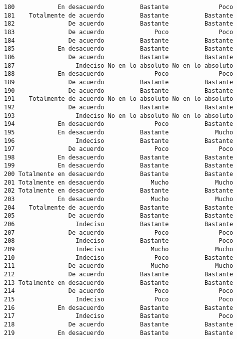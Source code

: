 \documentclass[
  letterpaper,
  DIV=11,
  numbers=noendperiod]{scrartcl}
\begin{document}
\begin{verbatim}
180            En desacuerdo          Bastante              Poco
181    Totalmente de acuerdo          Bastante          Bastante
182               De acuerdo          Bastante          Bastante
183               De acuerdo              Poco              Poco
184               De acuerdo          Bastante          Bastante
185            En desacuerdo          Bastante          Bastante
186               De acuerdo          Bastante          Bastante
187                 Indeciso No en lo absoluto No en lo absoluto
188            En desacuerdo              Poco              Poco
189               De acuerdo          Bastante          Bastante
190               De acuerdo          Bastante          Bastante
191    Totalmente de acuerdo No en lo absoluto No en lo absoluto
192               De acuerdo          Bastante          Bastante
193                 Indeciso No en lo absoluto No en lo absoluto
194            En desacuerdo              Poco          Bastante
195            En desacuerdo          Bastante             Mucho
196                 Indeciso          Bastante          Bastante
197               De acuerdo              Poco              Poco
198            En desacuerdo          Bastante          Bastante
199            En desacuerdo          Bastante          Bastante
200 Totalmente en desacuerdo          Bastante          Bastante
201 Totalmente en desacuerdo             Mucho             Mucho
202 Totalmente en desacuerdo          Bastante          Bastante
203            En desacuerdo             Mucho             Mucho
204    Totalmente de acuerdo          Bastante          Bastante
205               De acuerdo          Bastante          Bastante
206                 Indeciso          Bastante          Bastante
207               De acuerdo              Poco              Poco
208                 Indeciso          Bastante              Poco
209                 Indeciso             Mucho             Mucho
210                 Indeciso              Poco          Bastante
211               De acuerdo             Mucho             Mucho
212               De acuerdo          Bastante          Bastante
213 Totalmente en desacuerdo          Bastante          Bastante
214               De acuerdo              Poco              Poco
215                 Indeciso              Poco              Poco
216            En desacuerdo          Bastante          Bastante
217                 Indeciso          Bastante              Poco
218               De acuerdo          Bastante          Bastante
219            En desacuerdo          Bastante          Bastante

\end{verbatim}
\end{document}
